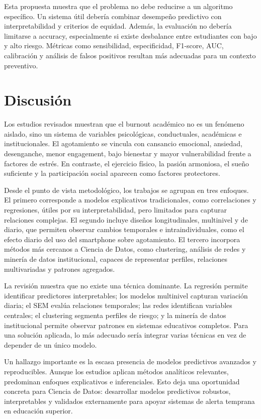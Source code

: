 \documentclass[12pt,a4paper]{article}
\begin{document}
Esta propuesta muestra que el problema no debe reducirse a un algoritmo específico. Un sistema útil debería combinar desempeño predictivo con interpretabilidad y criterios de equidad. Además, la evaluación no debería limitarse a accuracy, especialmente si existe desbalance entre estudiantes con bajo y alto riesgo. Métricas como sensibilidad, especificidad, F1-score, AUC, calibración y análisis de falsos positivos resultan más adecuadas para un contexto preventivo.

\section{Discusión}

Los estudios revisados muestran que el burnout académico no es un fenómeno aislado, sino un sistema de variables psicológicas, conductuales, académicas e institucionales. El agotamiento se vincula con cansancio emocional, ansiedad, desenganche, menor engagement, bajo bienestar y mayor vulnerabilidad frente a factores de estrés. En contraste, el ejercicio físico, la pasión armoniosa, el sueño suficiente y la participación social aparecen como factores protectores.

Desde el punto de vista metodológico, los trabajos se agrupan en tres enfoques. El primero corresponde a modelos explicativos tradicionales, como correlaciones y regresiones, útiles por su interpretabilidad, pero limitados para capturar relaciones complejas. El segundo incluye diseños longitudinales, multinivel y de diario, que permiten observar cambios temporales e intraindividuales, como el efecto diario del uso del smartphone sobre agotamiento. El tercero incorpora métodos más cercanos a Ciencia de Datos, como clustering, análisis de redes y minería de datos institucional, capaces de representar perfiles, relaciones multivariadas y patrones agregados.

La revisión muestra que no existe una técnica dominante. La regresión permite identificar predictores interpretables; los modelos multinivel capturan variación diaria; el SEM evalúa relaciones temporales; las redes identifican variables centrales; el clustering segmenta perfiles de riesgo; y la minería de datos institucional permite observar patrones en sistemas educativos completos. Para una solución aplicada, lo más adecuado sería integrar varias técnicas en vez de depender de un único modelo.

Un hallazgo importante es la escasa presencia de modelos predictivos avanzados y reproducibles. Aunque los estudios aplican métodos analíticos relevantes, predominan enfoques explicativos e inferenciales. Esto deja una oportunidad concreta para Ciencia de Datos: desarrollar modelos predictivos robustos, interpretables y validados externamente para apoyar sistemas de alerta temprana en educación superior.
\end{document}
